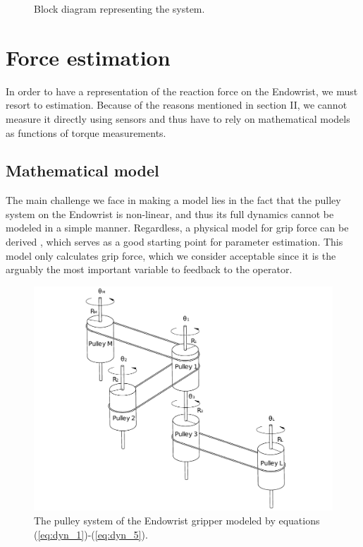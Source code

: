 \documentclass[conference]{IEEEtran}
\begin{document}
\begin{figure}[h]
\centering
{}
\caption{Block diagram representing the system.}
\end{figure}

\section{Force estimation}
In order to have a representation of the reaction force on the Endowrist, we must resort to estimation.
Because of the reasons mentioned in section II, we cannot measure it directly using sensors and thus have to rely on mathematical models as functions of torque measurements.

\subsection{Mathematical model}
The main challenge we face in making a model lies in the fact that the pulley system on the Endowrist is non-linear, and thus its full dynamics cannot be modeled in a simple manner.
Regardless, a physical model for grip force can be derived \cite{kim2014dynamic}, which serves as a good starting point for parameter estimation.
This model only calculates grip force, which we consider acceptable since it is the arguably the most important variable to feedback to the operator.
\begin{figure}
\centering
\includegraphics[width=\linewidth]{pulleys.pdf}
\caption{The pulley system of the Endowrist gripper modeled by equations (\ref{eq:dyn_1})-(\ref{eq:dyn_5}).}
\end{figure}
\end{document}
